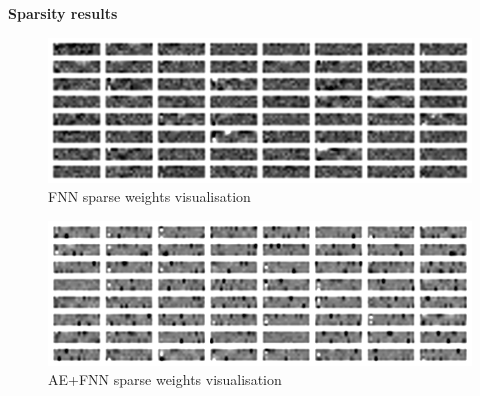 \documentclass[xcolor=dvipsnames]{beamer}
\begin{document}
\begin{frame}{\bf Sparsity results}


\begin{figure}[htbp]
  \centering
  \includegraphics[scale=0.4]{../../diagrams/layer_1_fnn_sparse.png}
  \caption*{FNN sparse weights visualisation}
  \label{img:FNN sparse weights visualisation}
\end{figure}

\begin{figure}[htbp]
  \centering
  \includegraphics[scale=0.4]{../../diagrams/layer_1_hnn_sparse.png}
  \caption*{AE+FNN sparse weights visualisation}
  \label{img:AE+FNN sparse weights visualisation}
\end{figure}

\end{frame}
\end{document}
